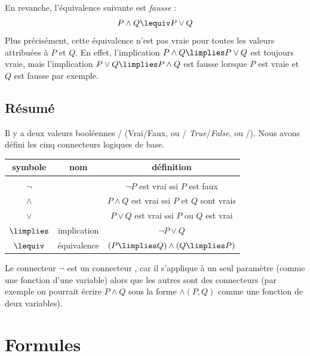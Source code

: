 \documentclass[11pt,class=report,crop=false]{standalone}
\begin{document}
En revanche, l'équivalence suivante est \emph{fausse} :
\[
P \land Q \lequiv P \lor Q
\]
Plus précisément, cette équivalence n'est pas vraie pour toutes les valeurs attribuées à $P$ et $Q$.
En effet, l'implication $P \land Q \limplies P \lor Q$ est toujours vraie, mais l'implication $P \lor Q \limplies P \land Q$ est fausse lorsque $P$ est vraie et $Q$ est fausse par exemple.


\subsection{Résumé}

Il y a deux valeurs booléennes \ltrue/\lfalse{} (Vrai/Faux, ou \ltruetrue/\lfalsefalse{} \emph{True}/\emph{False}, ou \lone/\lzero).
Nous avons défini les cinq connecteurs logiques de base.

\begin{center}
\begin{tabular}{c | c | c}
	symbole		& nom 		& définition \\
	\hline
	&&	\\[-2ex]
	$\lnot$ 	& \tnot			& $\lnot P$ est vrai ssi $P$ est faux \\
	$\land$ 	& \tand			& $P \land Q$ est vrai ssi $P$ et $Q$ sont vrais \\	
	$\lor$ 		& \tor			& $P \lor Q$ est vrai ssi $P$ ou $Q$ est vrai \\	
	$\limplies$ 	& implication	& $\lnot P \lor Q$ \\	
	$\lequiv$ 	& équivalence	& $(P \limplies Q) \land (Q \limplies P)$ \\				
\end{tabular}
\end{center}

Le connecteur $\lnot$ est un connecteur , car il s'applique à un seul paramètre (comme une fonction d'une variable) alors que les autres sont des connecteurs  (par exemple on pourrait écrire $P \land Q$ sous la forme $\land(P,Q)$ comme une fonction de deux variables).



\section{Formules}

\end{document}
